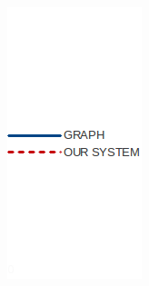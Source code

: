 \begin{figure}[ht]
\begin{minipage}{0.20\linewidth}
\centering
\includegraphics[width=\textwidth]{images/legenda.png}
\end{minipage}

\end{figure}



